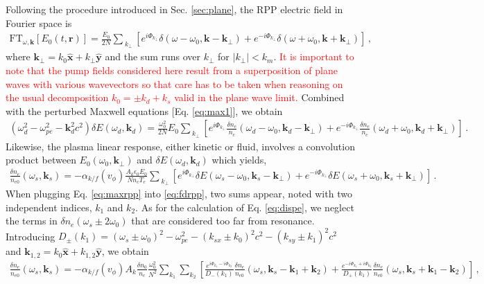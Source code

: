 \documentclass[
 reprint,
 superscriptaddress,
 amsmath,amssymb,
 aps,
]{revtex4-1}
\def\tc{\textcolor{red}}
\begin{document}
\begin{widetext}
Following the procedure introduced in Sec. \ref{sec:plane}, the RPP electric field in Fourier space is
\begin{align}
\mathrm{FT}_{\omega,\mathbf{k} }[E_0(t,\mathbf{r}) ]= \frac{E_0}{2N} \sum_{\ k_{\perp} }[ e^{i\Phi_{k_\perp}}\delta(\omega-\omega_0, \mathbf{k}-\mathbf{k}_\perp)    + e^{-i\Phi_{k_\perp}}\delta(\omega+\omega_0, \mathbf{k}+\mathbf{k}_\perp) ]
\, , \label{eq:erppf}
\end{align}
 where $\mathbf{k}_\perp= k_0\hat{\mathbf{x}} +k_\perp \hat{\mathbf{y}}$ and the sum runs over $k_\perp$ for $\vert k_\perp\vert  <k_m$.
 \tc{
  It is important to note that the pump fields considered here result  from a superposition of  plane waves with various wavevectors  so that care has to be taken when reasoning   on the usual decomposition $k_0=\pm k_d +k_s$ valid in the plane wave limit.
 }
 Combined with the perturbed Maxwell equations [Eq. \eqref{eq:max1}], we obtain
 \begin{align}
    (\omega_d^2 - \omega_{pe}^2 -\mathbf{k}_d^2c^2)\delta E(\omega_d,\mathbf{k}_d) = \frac{\omega_0^2}{2N} E_0 \sum_{\ k_{\perp} }   \left[e^{i\Phi_{k_\perp}}\frac{\delta n_e }{n_c}(\omega_d-\omega_0, \mathbf{k}_d-\mathbf{k}_\perp) +e^{-i\Phi_{k_\perp}}\frac{\delta n_e }{n_c}(\omega_d+\omega_0, \mathbf{k}_d+\mathbf{k}_\perp) \right] \, .\label{eq:maxrpp}
\end{align}
Likewise, the plasma linear response, either kinetic or fluid, involves a convolution product between $E_0(\omega_0,\mathbf{k}_\perp)$ and $\delta E(\omega_d,\mathbf{k}_d)$ which yields,
\begin{align}
   \frac{\delta n_e }{n_{e0}}(\omega_s,\mathbf{k}_s) = -\alpha_{k/f}(v_\phi) \frac{A_k\epsilon_0E_0}{Nn_c T_e} \sum_{\ k_{\perp} }     \left[e^{i\Phi_{k_\perp}}\delta E(\omega_s-\omega_0, \mathbf{k}_s-\mathbf{k}_{\perp}) +e^{-i\Phi_{k_\perp}}\delta E(\omega_s+\omega_0, \mathbf{k}_s+\mathbf{k}_{\perp}) \right] \, .\label{eq:fdrpp} 
\end{align}
When plugging Eq. \eqref{eq:maxrpp} into \eqref{eq:fdrpp}, two sums appear, noted with two independent indices, $k_1$ and $k_2$. As for the calculation of Eq. \eqref{eq:dispe}, we neglect the terms in $\delta n_e(\omega_s\pm 2\omega_0)$ that are considered too far from resonance. Introducing $D_\pm(k_{1})= (\omega_s\pm\omega_0)^2 - \omega_{pe}^2 -( k_{sx}\pm k_0) ^2c^2 -( k_{sy}\pm k_{1}) ^2c^2$ and $\mathbf{k}_{1,2}= k_0\hat{\mathbf{x}} +k_{1,2} \hat{\mathbf{y}}$, we obtain
\begin{align}
   \frac{\delta n_e }{n_{e0}}(\omega_s,\mathbf{k}_s) = -\alpha_{k/f}(v_\phi)A_k \frac{\delta n_0}{n_c} \frac{\omega_0^2}{N^2}\sum_{ k_{1} } \sum_{ k_{2} }        \left[ \frac{e^{i\Phi_{k_1}-i\Phi_{k_2}} }{D_-(k_{1})}\frac{\delta n_e }{n_{e0}}(\omega_s,\mathbf{k}_s-\mathbf{k}_{1}+\mathbf{k}_{2}) +\frac{e^{-i\Phi_{k_1}+i\Phi_{k_2}}}{D_+(k_{1})} \frac{\delta n_e }{n_{e0}}(\omega_s,\mathbf{k}_s+\mathbf{k}_{1}-\mathbf{k}_{2}) \right] \, ,\label{eq:fddrpp} 
\end{align}
 \end{widetext}
 
\end{document}
